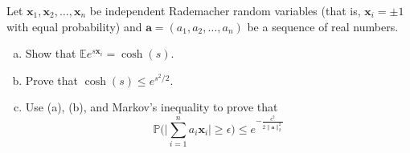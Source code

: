 \documentclass[12pt,letterpaper,cm]{hmcpset}
\newcommand\x{\boldsymbol{x}}
\renewcommand\a{\boldsymbol{a}}
\newcommand\E{\mathbb{E}}
\renewcommand\P{\mathbb{P}}
\begin{document}
\begin{problem}[1]
    Let $\x_1,\x_2,\ldots,\x_n$ be independent Rademacher random variables
    (that is, $\x_i = \pm 1$ with equal probability) and $\a=(a_1,a_2,\ldots,a_n)$
    be a sequence of real numbers.
\begin{enumerate}[(a)]
    \item Show that $\E e^{s \x_i} = \cosh(s)$.
    \item Prove that $\cosh(s) \leq e^{s^2/2}$.
    \item Use (a), (b), and Markov's inequality to prove that $$\P\biggl(\biggl|\sum_{i=1}^n a_i \x_i\biggr| \geq \epsilon\biggr) \leq e^{-\tfrac{\epsilon^2}{2\|\a\|_2^2}}$$
\end{enumerate}
\end{problem}

\begin{solution}
    \vfill
\end{solution}
\clearpage
\end{document}
